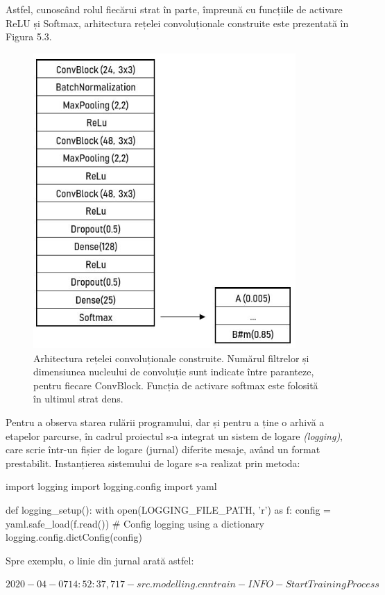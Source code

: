 \documentclass[a4paper,12pt]{report}
\begin{document}
Astfel, cunoscând rolul fiecărui strat în parte, împreună cu funcțiile de activare
ReLU și Softmax, arhitectura 
rețelei convoluționale construite este prezentată în Figura 5.3.
\begin{figure}[h!]
    \centering
    \includegraphics[width=10cm]{..//resources//cnn_arhitecture_image.JPG} 
    \caption{Arhitectura rețelei convoluționale construite. Numărul filtrelor 
    și dimensiunea nucleului de convoluție sunt indicate între paranteze, pentru 
    fiecare ConvBlock. Funcția de activare softmax este folosită în ultimul 
    strat dens.}
\end{figure}

Pentru a observa starea rulării programului, dar și pentru a 
ține o arhivă a etapelor parcurse, în cadrul proiectul s-a integrat
un sistem de logare \emph{(logging)}, care scrie într-un fișier 
de logare (jurnal) diferite mesaje, având un format prestabilit. Instanțierea sistemului de logare 
s-a realizat prin metoda: 
\begin{python}
    import logging
    import logging.config
    import yaml

    def logging_setup():
        with open(LOGGING_FILE_PATH, 'r') as f:
            config = yaml.safe_load(f.read())
            # Config logging using a dictionary
            logging.config.dictConfig(config)
\end{python}
Spre exemplu, o linie din jurnal arată astfel:

$2020-04-07 14:52:37,717 - src.modelling.cnntrain - INFO - Start Training Process$
\end{document}
